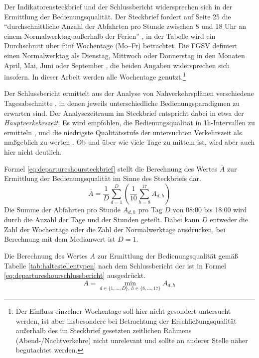 \documentclass[11pt,pdftex,a4paper]{scrartcl}
\begin{document}
	Der Indikatorensteckbrief und der Schlussbericht widersprechen sich in der Ermittlung der Bedienungsqualität. Der Steckbrief fordert auf Seite 25 die \enquote{durchschnittliche Anzahl der Abfahrten pro Stunde zwischen 8 und 18 Uhr an einem Normalwerktag außerhalb der Ferien} \parencite{bmdvIndikatorenLeichtGemacht2025}, in der Tabelle wird ein Durchschnitt über fünf Wochentage (Mo--Fr) betrachtet. Die FGSV definiert einen Normalwerktag als Dienstag, Mittwoch oder Donnerstag in den Monaten April, Mai, Juni oder September \parencite[vgl.][28]{forschungsgesellschaftfuerstrassen-undverkehrswesenEmpfehlungenFuerVerkehrserhebungen2012}, die beiden Angaben widersprechen sich insofern. In dieser Arbeit werden alle Wochentage genutzt.\footnote{Der Einfluss einzelner Wochentage soll hier nicht gesondert untersucht werden, ist aber insbesondere bei Betrachtung der Erschließungsqualität außerhalb des im Steckbrief gesetzten zeitlichen Rahmens (Abend-/Nachtverkehre) nicht unrelevant und sollte an anderer Stelle näher begutachtet werden.}
	
	Der Schlussbericht ermittelt aus der Analyse von Nahverkehrsplänen verschiedene Tagesabschnitte \parencite[82ff]{kcwgmbhMethodikUndEmpfehlungen2024}, in denen jeweils unterschiedliche Bedienungsparadigmen zu erwarten sind. Der Analysezeitraum im Steckbrief entspricht dabei in etwa der \textit{Hauptverkehrszeit}. Es wird empfohlen, die Bedienungsqualität in 1h-Intervallen zu ermitteln \parencite[87, 110]{kcwgmbhMethodikUndEmpfehlungen2024}, und die niedrigste Qualitätsstufe der untersuchten Verkehrszeit als maßgeblich zu werten \parencite[85]{kcwgmbhMethodikUndEmpfehlungen2024}. Ob und über wie viele Tage zu mitteln ist, wird aber auch hier nicht deutlich.
	
	Formel \ref{eq:departureshoursteckbrief} stellt die Berechnung des Wertes $\overline{A}$ zur Ermittlung der Bedienungsqualität im Sinne des Steckbriefs dar.
	\begin{equation}
		\label{eq:departureshoursteckbrief}
		\overline{A} = \frac{1}{D}\sum_{d=1}^{D}\left(\frac{1}{10}\sum_{h=8}^{17} A_{d,h}\right)
	\end{equation}
	Die Summe der Abfahrten pro Stunde $A_{d,h}$ pro Tag $D$ von 08:00 bis 18:00 wird durch die Anzahl der Tage und der Stunden geteilt. Dabei kann $D$ entweder die Zahl der Wochentage oder die Zahl der Normalwerktage ausdrücken, bei Berechnung mit dem Medianwert ist $D=1$.
	
	Die Berechnung des Wertes $A$ zur Ermittlung der Bedienungsqualität gemäß Tabelle \ref{tab:haltestellentypen} nach dem Schlussbericht der \textcite{kcwgmbhMethodikUndEmpfehlungen2024} ist in Formel \ref{eq:departureshourschlussbericht} ausgedrückt.
	\begin{equation}
		\label{eq:departureshourschlussbericht}
		A = \min_{d \in \{1,\dots,D\},\, h \in \{8,\dots,17\}} A_{d,h}
	\end{equation}
	
\end{document}
